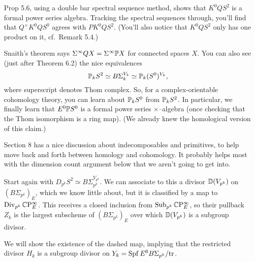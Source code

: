 Prop 5.6, using a double bar spectral sequence method, shows that $K^0 Q S^2$ is a formal power series algebra.  Tracking the spectral sequences through, you'll find that $Q^\times K^0 Q S^0$ agrees with $P K^0 Q S^2$.  (You'll also notice that $K^0 Q S^2$ only has one product on it, cf.\ Remark 5.4.)

Snaith's theorem says $\Sigma^\infty QX = \Sigma^\infty \P X$ for connected spaces $X$.  You can also see (just after Theorem 6.2) the nice equivalences \[\P_k S^2 \simeq B\Sigma_k^{V_k} \simeq \P_k(S^0)^{V_k},\] where superscript denotes Thom complex.  So, for a complex-orientable cohomology theory, you can learn about $\P_k S^0$ from $\P_k S^2$.  In particular, we finally learn that $E^0 \P S^0$ is a formal power series $\times$--algebra (once checking that the Thom isomorphism is a ring map).  (We already knew the homological version of this claim.)

Section 8 has a nice discussion about indecomposables and primitives, to help move back and forth between homology and cohomology.  It probably helps most with the dimension count argument below that we aren't going to get into.

Start again with $D_{p^k} S^2 \simeq B\Sigma_{p^k}^{V_{p^k}}$.  We can associate to this a divisor $\ThomDivisor(V_{p^k})$ on $(B\Sigma_{p^k})_E$, which we know little about, but it is classified by a map to $\Div_{p^k} \CP^\infty_E$.  This receives a closed inclusion from $\Sub_{p^k} \CP^\infty_E$, so their pullback $Z_k$ is the largest subscheme of $(B\Sigma_{p^k})_E$ over which $\ThomDivisor(V_{p^k})$ is a subgroup divisor.
\begin{center}
\end{center}
We will show the existence of the dashed map, implying that the restricted divisor $H_k$ is a subgroup divisor on $Y_k = \Spf E^0 B\Sigma_{p^k} / \mathrm{tr}$.

